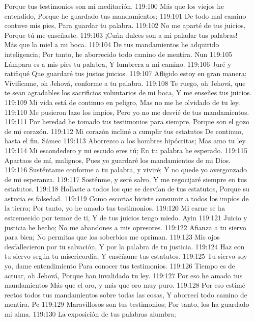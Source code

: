 Porque tus testimonios son mi meditación. 
119:100 Más que los viejos he entendido, 
Porque he guardado tus mandamientos; 
119:101 De todo mal camino contuve mis pies, 
Para guardar tu palabra. 
119:102 No me aparté de tus juicios, 
Porque tú me enseñaste. 
119:103 ¡Cuán dulces son a mi paladar tus palabras! 
Más que la miel a mi boca. 
119:104 De tus mandamientos he adquirido inteligencia; 
Por tanto, he aborrecido todo camino de mentira. 
Nun 
119:105 Lámpara es a mis pies tu palabra, 
Y lumbrera a mi camino. 
119:106 Juré y ratifiqué 
Que guardaré tus justos juicios. 
119:107 Afligido estoy en gran manera; 
Vivifícame, oh Jehová, conforme a tu palabra. 
119:108 Te ruego, oh Jehová, que te sean agradables los sacrificios voluntarios de mi boca, 
Y me enseñes tus juicios. 
119:109 Mi vida está de continuo en peligro, 
Mas no me he olvidado de tu ley. 
119:110 Me pusieron lazo los impíos, 
Pero yo no me desvié de tus mandamientos. 
119:111 Por heredad he tomado tus testimonios para siempre, 
Porque son el gozo de mi corazón. 
119:112 Mi corazón incliné a cumplir tus estatutos 
De continuo, hasta el fin. 
Sámec 
119:113 Aborrezco a los hombres hipócritas; 
Mas amo tu ley. 
119:114 Mi escondedero y mi escudo eres tú; 
En tu palabra he esperado. 
119:115 Apartaos de mí, malignos, 
Pues yo guardaré los mandamientos de mi Dios. 
119:116 Susténtame conforme a tu palabra, y viviré; 
Y no quede yo avergonzado de mi esperanza. 
119:117 Sosténme, y seré salvo, 
Y me regocijaré siempre en tus estatutos. 
119:118 Hollaste a todos los que se desvían de tus estatutos, 
Porque su astucia es falsedad. 
119:119 Como escorias hiciste consumir a todos los impíos de la tierra; 
Por tanto, yo he amado tus testimonios. 
119:120 Mi carne se ha estremecido por temor de ti, 
Y de tus juicios tengo miedo. 
Ayin 
119:121 Juicio y justicia he hecho; 
No me abandones a mis opresores. 
119:122 Afianza a tu siervo para bien; 
No permitas que los soberbios me opriman. 
119:123 Mis ojos desfallecieron por tu salvación, 
Y por la palabra de tu justicia. 
119:124 Haz con tu siervo según tu misericordia, 
Y enséñame tus estatutos. 
119:125 Tu siervo soy yo, dame entendimiento 
Para conocer tus testimonios. 
119:126 Tiempo es de actuar, oh Jehová, 
Porque han invalidado tu ley. 
119:127 Por eso he amado tus mandamientos 
Más que el oro, y más que oro muy puro. 
119:128 Por eso estimé rectos todos tus mandamientos sobre todas las cosas, 
Y aborrecí todo camino de mentira. 
Pe 
119:129 Maravillosos son tus testimonios; 
Por tanto, los ha guardado mi alma. 
119:130 La exposición de tus palabras alumbra; 
